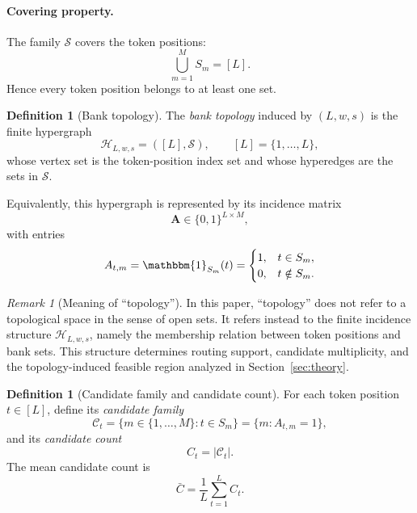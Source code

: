 \documentclass{article}
\theoremstyle{plain}
\theoremstyle{definition}
\newtheorem{definition}[theorem]{Definition}
\theoremstyle{remark}
\newtheorem{remark}[theorem]{Remark}
\begin{document}
\paragraph{Covering property.}
The family $\mathcal S$ covers the token positions:
\begin{equation}
\label{eq:covering-property}
\bigcup_{m=1}^M S_m=[L].
\end{equation}
Hence every token position belongs to at least one set.

\begin{definition}[Bank topology]
\label{def:bank-topology}
The \emph{bank topology} induced by $(L,w,s)$ is the finite hypergraph
\begin{equation}
\label{eq:bank-topology}
\mathcal{H}_{L,w,s}=([L],\mathcal S),
\qquad
[L]=\{1,\dots,L\},
\end{equation}
whose vertex set is the token-position index set and whose hyperedges are the sets in $\mathcal S$.

Equivalently, this hypergraph is represented by its incidence matrix
\begin{equation}
\label{eq:incidence-matrix}
\mathbf A\in\{0,1\}^{L\times M},
\end{equation}
with entries
\begin{equation}
\label{eq:incidence-entry}
A_{t,m}=\mathbbm{1}_{S_m}(t)=
\begin{cases}
1,& t\in S_m,\\
0,& t\notin S_m.
\end{cases}
\end{equation}
\end{definition}

\begin{remark}[Meaning of ``topology'']
\label{rem:topology-meaning}
In this paper, ``topology'' does not refer to a topological space in the sense of open sets. It refers instead to the finite incidence structure $\mathcal H_{L,w,s}$, namely the membership relation between token positions and bank sets. This structure determines routing support, candidate multiplicity, and the topology-induced feasible region analyzed in Section~\ref{sec:theory}.
\end{remark}

\begin{definition}[Candidate family and candidate count]
\label{def:candidate-family}
For each token position $t\in [L]$, define its \emph{candidate family}
\begin{equation}
\label{eq:candidate-family}
\mathcal C_t=\{m\in\{1,\dots,M\}: t\in S_m\}
=\{m:A_{t,m}=1\},
\end{equation}
and its \emph{candidate count}
\begin{equation}
\label{eq:candidate-count}
C_t=|\mathcal C_t|.
\end{equation}
The mean candidate count is
\begin{equation}
\label{eq:mean-candidate-count}
\bar C=\frac{1}{L}\sum_{t=1}^L C_t.
\end{equation}
\end{definition}
\end{document}
